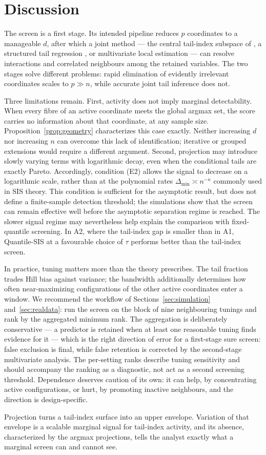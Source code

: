 \section{Discussion}\label{sec:discussion}

The screen is a first stage. Its intended
pipeline reduces $p$ coordinates to a manageable $d$, after which a joint
method --- the central tail-index subspace of \citet{gardesPodgorny2025}, a
structured tail regression \citep{wangTsai2009,sasakiTaoWang2026}, or
multivariate local estimation --- can resolve interactions and correlated
neighbours among the retained variables. The two stages solve different
problems: rapid elimination of evidently irrelevant coordinates scales to
$p\gg n$, while accurate joint tail inference does not.

Three limitations remain. First, activity does not imply marginal
detectability. When every fibre of an active coordinate meets the global
argmax set, the score carries no information about that coordinate, at any
sample size. Proposition~\ref{prop:geometry} characterizes this case
exactly. Neither increasing $d$ nor increasing $n$ can overcome this lack
of identification; iterative or grouped extensions would require a
different argument. Second, projection may introduce slowly varying terms with logarithmic
decay, even when the conditional tails are exactly Pareto. Accordingly,
condition (E2) allows the signal to decrease on a logarithmic scale, rather
than at the polynomial rates $\Delta_{\min}\asymp n^{-\kappa}$ commonly
used in SIS theory. This condition is sufficient for the asymptotic result, but does not define a finite-sample detection threshold; the simulations show that the screen can remain effective well before the asymptotic separation regime is reached. The slower signal regime may nevertheless help
explain the comparison with fixed-quantile screening. In A2, where the
tail-index gap is smaller than in A1, Quantile-SIS at a favourable choice
of $\tau$ performs better than the tail-index screen.


In practice, tuning matters more than the theory prescribes. The tail
fraction trades Hill bias against variance; the bandwidth additionally
determines how often near-maximizing configurations of the other active
coordinates enter a window. We recommend the workflow of
Sections~\ref{sec:simulation} and~\ref{sec:realdata}: run the screen on
the block of nine neighbouring tunings and rank by the aggregated
minimum rank. The aggregation is deliberately conservative --- a
predictor is retained when at least one reasonable tuning finds
evidence for it --- which is the right direction of error for a
first-stage sure screen: false exclusion is final, while false
retention is corrected by the second-stage multivariate analysis. The
per-setting ranks describe tuning sensitivity and should accompany the
ranking as a diagnostic, not act as a second screening threshold.
Dependence deserves caution of its own: it can help, by concentrating
active configurations, or hurt, by promoting inactive neighbours, and
the direction is design-specific.

Projection turns a tail-index surface into an upper envelope. Variation
of that envelope is a scalable marginal signal for tail-index activity,
and its absence, characterized by the argmax projections, tells the
analyst exactly what a marginal screen can and cannot see.
